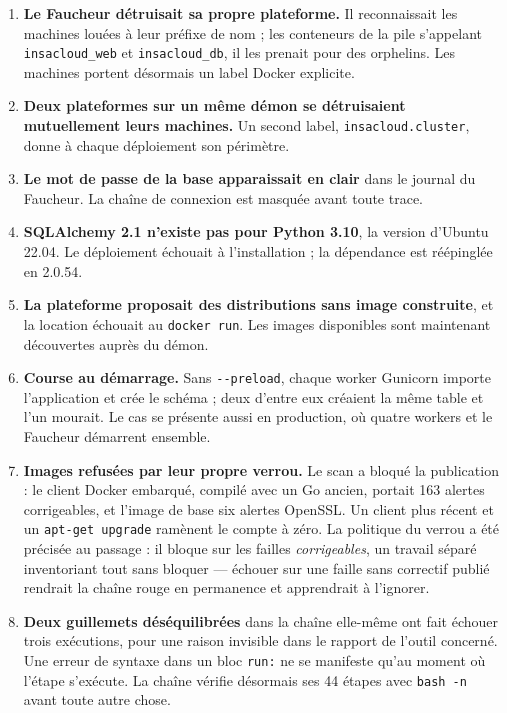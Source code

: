 \documentclass[11pt,a4paper]{article}
\begin{document}
\begin{enumerate}[leftmargin=*,itemsep=2pt]
\item \textbf{Le Faucheur détruisait sa propre plateforme.} Il reconnaissait
les machines louées à leur préfixe de nom ; les conteneurs de la pile
s'appelant \texttt{insacloud\_web} et \texttt{insacloud\_db}, il les prenait
pour des orphelins. Les machines portent désormais un label Docker explicite.

\item \textbf{Deux plateformes sur un même démon se détruisaient mutuellement
leurs machines.} Un second label, \texttt{insacloud.cluster}, donne à chaque
déploiement son périmètre.

\item \textbf{Le mot de passe de la base apparaissait en clair} dans le
journal du Faucheur. La chaîne de connexion est masquée avant toute trace.

\item \textbf{SQLAlchemy 2.1 n'existe pas pour Python 3.10}, la version
d'Ubuntu 22.04. Le déploiement échouait à l'installation ; la dépendance est
réépinglée en 2.0.54.

\item \textbf{La plateforme proposait des distributions sans image
construite}, et la location échouait au \texttt{docker run}. Les images
disponibles sont maintenant découvertes auprès du démon.

\item \textbf{Course au démarrage.} Sans \texttt{-{}-preload}, chaque worker
Gunicorn importe l'application et crée le schéma ; deux d'entre eux créaient
la même table et l'un mourait. Le cas se présente aussi en production, où
quatre workers et le Faucheur démarrent ensemble.

\item \textbf{Images refusées par leur propre verrou.} Le scan a bloqué la
publication : le client Docker embarqué, compilé avec un Go ancien, portait
163 alertes corrigeables, et l'image de base six alertes OpenSSL. Un client
plus récent et un \texttt{apt-get upgrade} ramènent le compte à zéro. La
politique du verrou a été précisée au passage : il bloque sur les failles
\emph{corrigeables}, un travail séparé inventoriant tout sans bloquer ---
échouer sur une faille sans correctif publié rendrait la chaîne rouge en
permanence et apprendrait à l'ignorer.

\item \textbf{Deux guillemets déséquilibrées} dans la chaîne elle-même ont
fait échouer trois exécutions, pour une raison invisible dans le rapport de
l'outil concerné. Une erreur de syntaxe dans un bloc \texttt{run:} ne se
manifeste qu'au moment où l'étape s'exécute. La chaîne vérifie désormais ses
44 étapes avec \texttt{bash -n} avant toute autre chose.
\end{enumerate}
\end{document}
